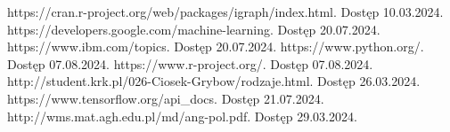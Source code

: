 \begin{thebibliography}{4}
     https://cran.r-project.org/web/packages/igraph/index.html. Dostęp 10.03.2024.
     https://developers.google.com/machine-learning. Dostęp 20.07.2024.
     https://www.ibm.com/topics. Dostęp 20.07.2024.
     https://www.python.org/. Dostęp 07.08.2024.
     https://www.r-project.org/. Dostęp 07.08.2024.
     http://student.krk.pl/026-Ciosek-Grybow/rodzaje.html. Dostęp 26.03.2024.
     https://www.tensorflow.org/api\_docs. Dostęp 21.07.2024.
     http://wms.mat.agh.edu.pl/\texttildelow md/ang-pol.pdf. Dostęp 29.03.2024.
\end{thebibliography}